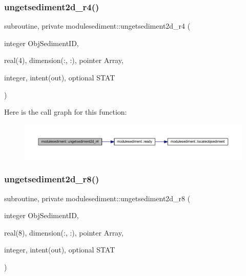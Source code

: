\subsubsection{\texorpdfstring{ungetsediment2d\+\_\+r4()}{ungetsediment2d\_r4()}}
{\footnotesize\ttfamily subroutine, private modulesediment\+::ungetsediment2d\+\_\+r4 (\begin{DoxyParamCaption}\item[{integer}]{Obj\+Sediment\+ID,  }\item[{real(4), dimension(\+:, \+:), pointer}]{Array,  }\item[{integer, intent(out), optional}]{S\+T\+AT }\end{DoxyParamCaption})\hspace{0.3cm}{\ttfamily [private]}}

Here is the call graph for this function\+:\nopagebreak
\begin{figure}[H]
\begin{center}
\leavevmode
\includegraphics[width=350pt]{namespacemodulesediment_af3fda7dbc66fbbecc4cf8ca7d4fdf95d_cgraph}
\end{center}
\end{figure}
\mbox{\label{namespacemodulesediment_aea72603e1507bed2899b17d9e29b67c9}} 
\subsubsection{\texorpdfstring{ungetsediment2d\+\_\+r8()}{ungetsediment2d\_r8()}}
{\footnotesize\ttfamily subroutine, private modulesediment\+::ungetsediment2d\+\_\+r8 (\begin{DoxyParamCaption}\item[{integer}]{Obj\+Sediment\+ID,  }\item[{real(8), dimension(\+:, \+:), pointer}]{Array,  }\item[{integer, intent(out), optional}]{S\+T\+AT }\end{DoxyParamCaption})\hspace{0.3cm}{\ttfamily [private]}}

